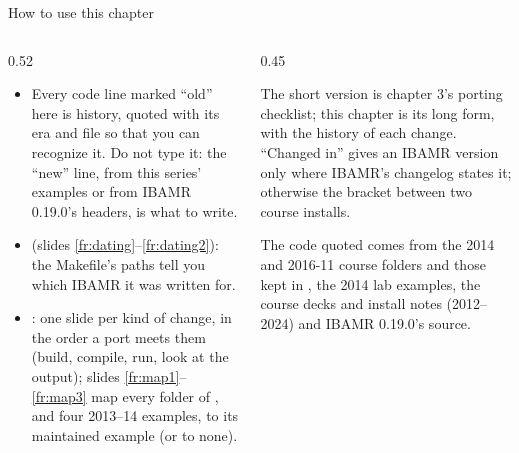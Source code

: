 \documentclass[aspectratio=169,11pt]{beamer}
\begin{document}
\begin{frame}{How to use this chapter}
\label{fr:use}
\begin{columns}[T,onlytextwidth]
\begin{column}{0.52\textwidth}
\small
\begin{itemize}\setlength{\itemsep}{3pt}
  \item {} Every code line marked ``old'' here is history, quoted with its era and file so that you can recognize it. Do not type it: the ``new'' line, from this series' examples or from IBAMR 0.19.0's headers, is what to write.
  \item {} (slides \ref{fr:dating}--\ref{fr:dating2}): the Makefile's paths tell you which IBAMR it was written for.
  \item {}: one slide per kind of change, in the order a port meets them (build, compile, run, look at the output); slides \ref{fr:map1}--\ref{fr:map3} map every folder of , and four 2013--14 examples, to its maintained example (or to none).
\end{itemize}
\end{column}
\begin{column}{0.45\textwidth}
\begin{punchbox}
\small The short version is chapter 3's porting checklist; this chapter is its long form, with the history of each change. ``Changed in'' gives an IBAMR version only where IBAMR's changelog states it; otherwise the bracket between two course installs.
\end{punchbox}
\vspace{2mm}
\footnotesize The code quoted comes from the 2014 and 2016-11 course folders and those kept in , the 2014 lab examples, the course decks and install notes (2012--2024) and IBAMR 0.19.0's source.
\end{column}
\end{columns}
\end{frame}
\end{document}

